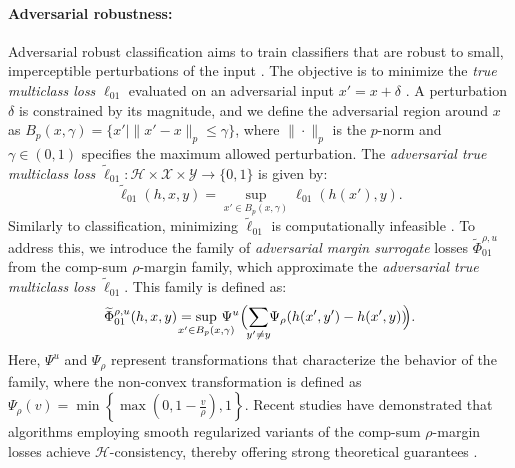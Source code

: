 \paragraph{Adversarial robustness:} 
Adversarial robust classification aims to train classifiers that are robust to small, imperceptible perturbations of the input \citep{goodfellow2014explaining, Madry2017TowardsDL}. The objective is to minimize the \textit{true multiclass loss} $\ell_{01}$ evaluated on an adversarial input $x'=x+\delta$ \citep{ Gowal2020UncoveringTL, Awasthi_Mao_Mohri_Zhong_2022_multi}.  A perturbation $\delta$ is constrained by its magnitude, and we define the adversarial region around $x$ as \( B_p(x, \gamma) = \{ x' \mid \|x' - x\|_p \leq \gamma \} \), where \(\| \cdot \|_p\) is the \(p\)-norm and \(\gamma \in (0,1)\) specifies the maximum allowed perturbation. The \textit{adversarial true multiclass loss} $\widetilde{\ell}_{01}: \mathcal{H} \times \mathcal{X} \times \mathcal{Y} \to \{0,1\}$ is given by:
\begin{equation}
    \widetilde{\ell}_{01}(h,x,y) = \sup_{x' \in B_p(x, \gamma)} \ell_{01}(h(x'), y).
\end{equation}
Similarly to classification, minimizing \(\widetilde{\ell}_{01}\) is computationally infeasible \citep{Zhang, bartlett1, Awasthi_Mao_Mohri_Zhong_2022_multi}. To address this, we introduce the family of \textit{adversarial margin surrogate} losses \(\widetilde{\Phi}^{\rho,u}_{01}\) from the comp-sum \(\rho\)-margin family, which approximate the \textit{adversarial true multiclass loss} \(\widetilde{\ell}_{01}\). This family is defined as:
\begin{equation}\label{eq:family_sup}
    \widetilde{\Phi}^{\rho,u}_{01}(h,x,y) = \mspace{-23mu} \sup_{x'\in B_p(x,\gamma)} \mspace{-20mu}\Psi^u \Big(\mspace{-5mu}\sum_{y'\not =y}\mspace{-5mu}\Psi_\rho (h(x',y') - h(x',y))\mspace{-5mu}\Big).
\end{equation}
Here, \(\Psi^u\) and \(\Psi_\rho\) represent transformations that characterize the behavior of the family, where the non-convex transformation is defined as \(\Psi_\rho(v) = \min\left\{\max\left(0, 1 - \frac{v}{\rho}\right), 1\right\}\). Recent studies have demonstrated that algorithms employing smooth regularized variants of the comp-sum \(\rho\)-margin losses achieve \(\mathcal{H}\)-consistency, thereby offering strong theoretical guarantees \citep{Awasthi_Mao_Mohri_Zhong_2022_multi, Grounded, mao2023crossentropylossfunctionstheoretical}.



